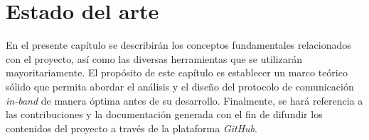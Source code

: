 \chapter{Estado del arte}
\label{estadoArte}

En el presente capítulo se describirán los conceptos fundamentales relacionados con el proyecto, así como las diversas herramientas que se utilizarán mayoritariamente. El propósito de este capítulo es establecer un marco teórico sólido que permita abordar el análisis y el diseño del protocolo de comunicación \textit{in-band} de manera óptima antes de su desarrollo. Finalmente, se hará referencia a las contribuciones y la documentación generada con el fin de difundir los contenidos del proyecto a través de la plataforma \textit{GitHub}.




















